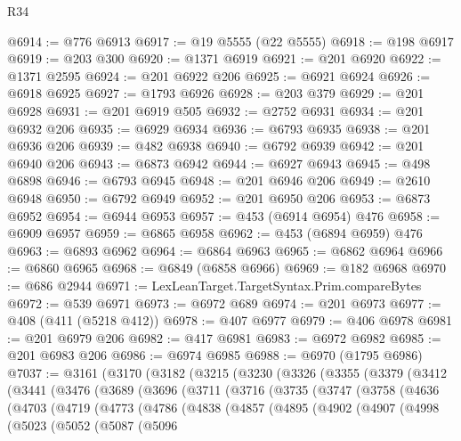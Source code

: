 \begin{lexlean}{R34}
\begin{coremodule}
@6914 := @776 @6913
@6917 := @19 @5555 (@22 @5555)
@6918 := @198 @6917
@6919 := @203 @300
@6920 := @1371 @6919
@6921 := @201 @6920
@6922 := @1371 @2595
@6924 := @201 @6922 @206
@6925 := @6921 @6924
@6926 := @6918 @6925
@6927 := @1793 @6926
@6928 := @203 @379
@6929 := @201 @6928
@6931 := @201 @6919 @505
@6932 := @2752 @6931
@6934 := @201 @6932 @206
@6935 := @6929 @6934
@6936 := @6793 @6935
@6938 := @201 @6936 @206
@6939 := @482 @6938
@6940 := @6792 @6939
@6942 := @201 @6940 @206
@6943 := @6873 @6942
@6944 := @6927 @6943
@6945 := @498 @6898
@6946 := @6793 @6945
@6948 := @201 @6946 @206
@6949 := @2610 @6948
@6950 := @6792 @6949
@6952 := @201 @6950 @206
@6953 := @6873 @6952
@6954 := @6944 @6953
@6957 := @453 (@6914 @6954) @476
@6958 := @6909 @6957
@6959 := @6865 @6958
@6962 := @453 (@6894 @6959) @476
@6963 := @6893 @6962
@6964 := @6864 @6963
@6965 := @6862 @6964
@6966 := @6860 @6965
@6968 := @6849 (@6858 @6966)
@6969 := @182 @6968
@6970 := @686 @2944
@6971 := LexLeanTarget.TargetSyntax.Prim.compareBytes
@6972 := @539 @6971
@6973 := @6972 @689
@6974 := @201 @6973
@6977 := @408 (@411 (@5218 @412))
@6978 := @407 @6977
@6979 := @406 @6978
@6981 := @201 @6979 @206
@6982 := @417 @6981
@6983 := @6972 @6982
@6985 := @201 @6983 @206
@6986 := @6974 @6985
@6988 := @6970 (@1795 @6986)
@7037 := @3161
    (@3170
      (@3182
        (@3215
          (@3230
            (@3326
              (@3355
                (@3379
                  (@3412
                    (@3441
                      (@3476
                        (@3689
                          (@3696
                            (@3711
                              (@3716
                                (@3735
                                  (@3747
                                    (@3758
                                      (@4636
                                        (@4703
                                          (@4719
                                            (@4773
                                              (@4786
                                                (@4838
                                                  (@4857
                                                    (@4895
                                                      (@4902
                                                        (@4907
                                                          (@4998
                                                            (@5023
                                                              (@5052
                                                                (@5087
                                                                  (@5096

\end{coremodule}
\end{lexlean}
